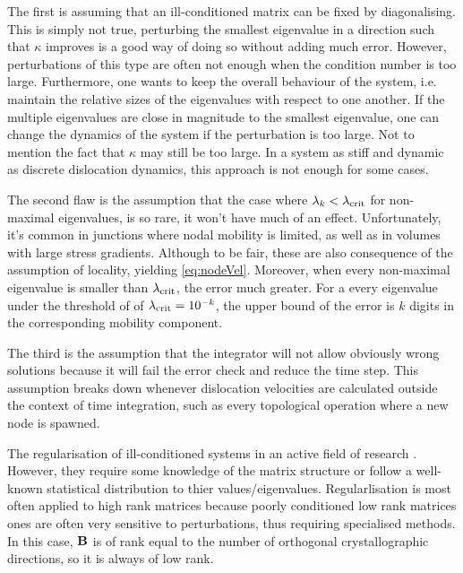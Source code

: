 The first is assuming that an ill-conditioned matrix can be fixed by diagonalising. This is simply not true, perturbing the smallest eigenvalue in a direction such that $\kappa$ improves is a good way of doing so without adding much error. However, perturbations of this type are often not enough when the condition number is too large. Furthermore, one wants to keep the overall behaviour of the system, i.e. maintain the relative sizes of the eigenvalues with respect to one another. If the multiple eigenvalues are close in magnitude to the smallest eigenvalue, one can change the dynamics of the system if the perturbation is too large. Not to mention the fact that $\kappa$ may still be too large. In a system as stiff and dynamic as discrete dislocation dynamics, this approach is not enough for some cases.

The second flaw is the assumption that the case where $\lambda_k < \lambda_{\textrm{crit}}$ for non-maximal eigenvalues, is so rare, it won't have much of an effect. Unfortunately, it's common in junctions where nodal mobility is limited, as well as in volumes with large stress gradients. Although to be fair, these are also consequence of the assumption of locality, yielding \cref{eq:nodeVel}. Moreover, when every non-maximal eigenvalue is smaller than $\lambda_{\textrm{crit}}$, the error much greater. For a every eigenvalue under the threshold of of $\lambda_{\textrm{crit}} = 10^{-k}$, the upper bound of the error is $k$ digits in the corresponding mobility component.

The third is the assumption that the integrator will not allow obviously wrong solutions because it will fail the error check and reduce the time step. This assumption breaks down whenever dislocation velocities are calculated outside the context of time integration, such as every topological operation where a new node is spawned.

The regularisation of ill-conditioned systems in an active field of research \cite{regularisation1,regularisation2,regularisation3}. However, they require some knowledge of the matrix structure or follow a well-known statistical distribution to thier values/eigenvalues. Regularlisation is most often applied to high rank matrices because poorly conditioned low rank matrices ones are often very sensitive to perturbations, thus requiring specialised methods. In this case, $\mathbf{B}$ is of rank equal to the number of orthogonal crystallographic directions, so it is always of low rank.

